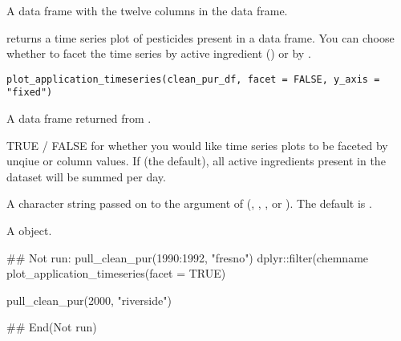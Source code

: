 \documentclass[a4paper]{book}
\begin{document}
%
\begin{Value}
A data frame with the twelve columns in the
 data frame.
\end{Value}
%
\begin{Description}\relax
{} returns a  time series plot
of pesticides present in a  data frame. You can choose
whether to facet the time series by active ingredient () or by
.
\end{Description}
%
\begin{Usage}
\begin{verbatim}
plot_application_timeseries(clean_pur_df, facet = FALSE, y_axis = "fixed")
\end{verbatim}
\end{Usage}
%
\begin{Arguments}
\begin{ldescription}
\item[\code{clean\_pur\_df}] A data frame returned from .

\item[\code{facet}] TRUE / FALSE for whether you would like time series
plots to be faceted by unqiue  or 
column values. If  (the default), all active ingredients
present in the dataset will be summed per day.

\item[\code{y\_axis}] A character string passed on to the  argument of
 (, , ,
or ). The default is .
\end{ldescription}
\end{Arguments}
%
\begin{Value}
A  object.
\end{Value}
%
\begin{Examples}
\begin{ExampleCode}
## Not run:
pull_clean_pur(1990:1992, "fresno") %
    dplyr::filter(chemname %
    plot_application_timeseries(facet = TRUE)

pull_clean_pur(2000, "riverside") %

## End(Not run)
\end{ExampleCode}
\end{Examples}
\end{document}
